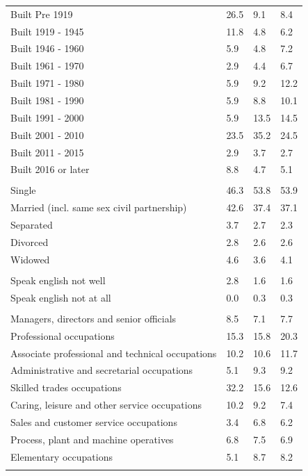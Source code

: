 \documentclass{article}
\begin{document}
\begin{table}[h]
\begin{tabular}{KTTT}
    \hline
Built Pre 1919 & 26.5&  9.1&  8.4\\
Built 1919 - 1945 & 11.8&  4.8&  6.2\\
Built  1946 - 1960 & 5.9& 4.8& 7.2\\
Built  1961 - 1970 & 2.9& 4.4& 6.7\\
Built  1971 - 1980 &  5.9&  9.2& 12.2\\
Built  1981 - 1990 &  5.9&  8.8& 10.1\\
Built  1991 - 2000 &  5.9& 13.5& 14.5\\
Built  2001 - 2010 & 23.5& 35.2& 24.5\\
Built  2011 - 2015 & 2.9& 3.7& 2.7\\
Built  2016 or later & 8.8& 4.7& 5.1\\
\hline
    \\
    \hline
Single & 46.3& 53.8& 53.9\\
Married (incl. same sex civil partnership) & 42.6& 37.4& 37.1\\
Separated  & 3.7& 2.7& 2.3\\
Divorced  & 2.8& 2.6& 2.6\\
Widowed & 4.6& 3.6& 4.1\\
\hline
    \\ 
    \hline
Speak english not well & 2.8& 1.6& 1.6\\
Speak english not at all & 0.0& 0.3& 0.3\\
\hline
    \\
    \hline
Managers, directors and senior officials & 8.5& 7.1& 7.7\\
Professional occupations & 15.3& 15.8& 20.3\\
Associate professional and technical occupations & 10.2& 10.6& 11.7\\
Administrative and secretarial occupations & 5.1& 9.3& 9.2\\
Skilled trades occupations & 32.2& 15.6& 12.6\\
Caring, leisure and other service occupations & 10.2&  9.2&  7.4\\
Sales and customer service occupations & 3.4& 6.8& 6.2\\
Process, plant and machine operatives & 6.8& 7.5& 6.9\\
Elementary occupations & 5.1& 8.7& 8.2\\
\hline
\end{tabular}
\end{table}
\end{document}
